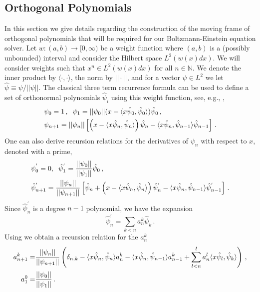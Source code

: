 \subsection{Orthogonal Polynomials}\label{sec:orthopolyApp}
In this section we give details regarding the construction of the moving frame of orthogonal polynomials that will be required for our Boltzmann-Einstein equation solver.
Let $w:(a,b)\rightarrow [0,\infty)$ be a weight function where $(a,b)$ is a (possibly unbounded) interval and consider the Hilbert space $L^2(w(x) dx)$.   We will consider weights such that $x^n\in L^2(w(x) dx)$ for all $n\in\mathbb{N}$. We denote the inner product by $\langle\cdot,\cdot\rangle$, the norm by $||\cdot||$, and for a vector $\psi\in L^2$ we let $\hat{\psi}\equiv \psi/||\psi||$.  The classical three term recurrence formula can be used to define a set of orthonormal polynomials $\hat{\psi}_i$ using this weight function, see, e.g.,  \cite{Olver},
\begin{align}\label{polyRecursion}
&\psi_0=1\,, \hspace{2mm} \psi_1=||\psi_0||(x-\langle x\hat\psi_0,\hat{\psi}_0\rangle)\hat{\psi}_0\,,\\
&\psi_{n+1}=||\psi_n||\left[\left(x-\langle x\hat\psi_n,\hat\psi_n\rangle\right)\hat\psi_n-\langle x\hat\psi_n,\hat\psi_{n-1}\rangle\hat\psi_{n-1}\right]\,.\notag
\end{align}
One can also derive recursion relations for the derivatives of $\psi_n$ with respect to $x$, denoted with a prime,
\begin{align}\label{derivRec}
&\psi_0^{'}=0, \hspace{2mm} \hat{\psi}_1^{'}=\frac{||\psi_0||}{||\psi_1||}\hat\psi_0\,,\\
&\hat{\psi}_{n+1}^{'}=\frac{||\psi_n||}{||\psi_{n+1}||}\left[\hat\psi_n+\left(x-\langle x\hat\psi_n,\hat\psi_n\rangle\right)\hat{\psi}_n^{'}-\langle x\hat\psi_n,\hat\psi_{n-1}\rangle\hat{\psi}_{n-1}^{'}\right]\,.\notag
\end{align}
Since $\hat{\psi}_n^{'}$ is a degree $n-1$ polynomial, we have the expansion 
\begin{equation}
\hat{\psi}_n^{'}=\sum_{k<n} a_n^k \hat{\psi}_k\,.
\end{equation}
Using  we obtain a recursion relation for the $a_n^k$
\begin{align}
a_{n+1}^k=&\frac{||\psi_n||}{||\psi_{n+1}||}\left(\delta_{n,k}-\langle x\hat\psi_n,\hat\psi_{n}\rangle a_n^k-\langle x\hat\psi_n,\hat\psi_{n-1}\rangle a_{n-1}^k+\sum_{l<n}^la_n^l\langle x\hat\psi_l,\hat\psi_k\rangle\right)\,,\notag\\
a_1^0=&\frac{||\psi_0||}{||\psi_1||}\,.\notag
\end{align}

